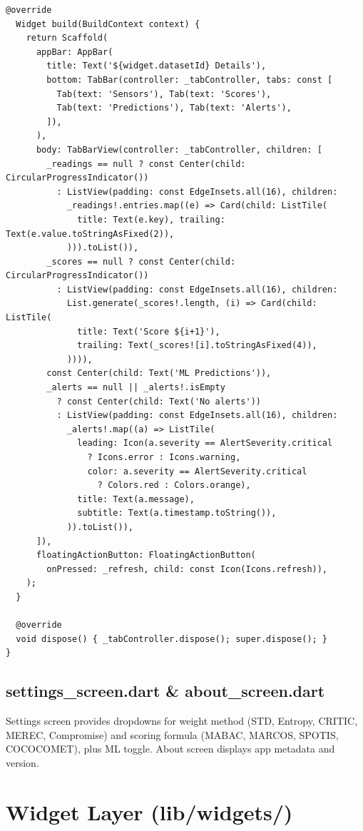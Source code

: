 \documentclass[12pt,a4paper,oneside]{report}
\begin{document}
\begin{lstlisting}[style=dartstyle]
  @override
  Widget build(BuildContext context) {
    return Scaffold(
      appBar: AppBar(
        title: Text('${widget.datasetId} Details'),
        bottom: TabBar(controller: _tabController, tabs: const [
          Tab(text: 'Sensors'), Tab(text: 'Scores'),
          Tab(text: 'Predictions'), Tab(text: 'Alerts'),
        ]),
      ),
      body: TabBarView(controller: _tabController, children: [
        _readings == null ? const Center(child: CircularProgressIndicator())
          : ListView(padding: const EdgeInsets.all(16), children:
            _readings!.entries.map((e) => Card(child: ListTile(
              title: Text(e.key), trailing: Text(e.value.toStringAsFixed(2)),
            ))).toList()),
        _scores == null ? const Center(child: CircularProgressIndicator())
          : ListView(padding: const EdgeInsets.all(16), children:
            List.generate(_scores!.length, (i) => Card(child: ListTile(
              title: Text('Score ${i+1}'),
              trailing: Text(_scores![i].toStringAsFixed(4)),
            )))),
        const Center(child: Text('ML Predictions')),
        _alerts == null || _alerts!.isEmpty
          ? const Center(child: Text('No alerts'))
          : ListView(padding: const EdgeInsets.all(16), children:
            _alerts!.map((a) => ListTile(
              leading: Icon(a.severity == AlertSeverity.critical
                ? Icons.error : Icons.warning,
                color: a.severity == AlertSeverity.critical
                  ? Colors.red : Colors.orange),
              title: Text(a.message),
              subtitle: Text(a.timestamp.toString()),
            )).toList()),
      ]),
      floatingActionButton: FloatingActionButton(
        onPressed: _refresh, child: const Icon(Icons.refresh)),
    );
  }

  @override
  void dispose() { _tabController.dispose(); super.dispose(); }
}
\end{lstlisting}

\section{settings\_screen.dart \& about\_screen.dart}

Settings screen provides dropdowns for weight method (STD, Entropy, CRITIC, MEREC, Compromise) and scoring formula (MABAC, MARCOS, SPOTIS, COCOCOMET), plus ML toggle. About screen displays app metadata and version.

\chapter{Widget Layer (lib/widgets/)}
\label{ch:widgets}
\end{document}
